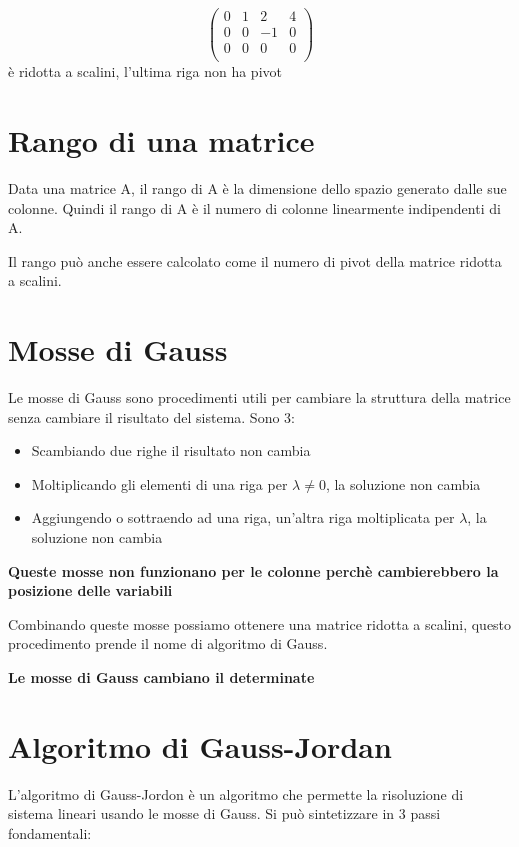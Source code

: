 \documentclass[a4paper, 10pt]{article}
\begin{document}
$$\left(\begin{matrix}0&1&2&4\\0&0&-1&0\\0&0&0&0\\\end{matrix}\right) $$ è ridotta a scalini, l'ultima riga non ha pivot

\section{Rango di una matrice}

Data una matrice A, il rango di A è la dimensione dello spazio generato dalle sue colonne. Quindi il rango di A è il numero di colonne linearmente indipendenti di A.

Il rango può anche essere calcolato come il numero di pivot della matrice ridotta a scalini.

\section{Mosse di Gauss}

Le mosse di Gauss sono procedimenti utili per cambiare la struttura della matrice senza cambiare il risultato del sistema. Sono 3:

\begin{itemize}
	\item Scambiando due righe il risultato non cambia
	\item Moltiplicando gli elementi di una riga per $\lambda \neq 0$, la soluzione non cambia
	\item Aggiungendo o sottraendo ad una riga, un'altra riga moltiplicata per $\lambda$, la soluzione non cambia
\end{itemize}

\textbf{Queste mosse non funzionano per le colonne perchè cambierebbero la posizione delle variabili}

Combinando queste mosse possiamo ottenere una matrice ridotta a scalini, questo procedimento prende il nome di algoritmo di Gauss.

\textbf{Le mosse di Gauss cambiano il determinate}

\section{Algoritmo di Gauss-Jordan}
L'algoritmo di Gauss-Jordon è un algoritmo che permette la risoluzione di sistema lineari usando le mosse di Gauss. Si può sintetizzare in 3 passi fondamentali:
\end{document}
